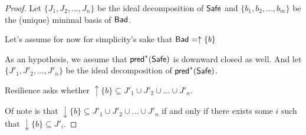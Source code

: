 \begin{proof}
Let $\{J_1, J_2,...,J_n\}$ be the ideal decomposition of $\textsf{Safe}$ and $\{b_1,b_2,...,b_m\}$ be the (unique) minimal basis of $\textsf{Bad}$.

Let's assume for now for simplicity's sake that $\textsf{Bad} = \uparrow \{b\}$ 

As an hypothesis, we assume that $\textsf{pred}^*(\textsf{Safe})$ is downward closed as well.
And let $\{J'_1, J'_2,...,J'_n\}$ be the ideal decomposition of $\textsf{pred}^*(\textsf{Safe})$.

Resilience asks whether 
$ \uparrow \{b\} \subseteq J'_1 \cup J'_2 \cup ... \cup J'_n$.

Of note is that $ \downarrow \{b\} \subseteq J'_1 \cup J'_2 \cup ... \cup J'_n$
if and only if
there exists some $i$ such that
$\downarrow \{b\} \subseteq J'_i$.

\end{proof}





